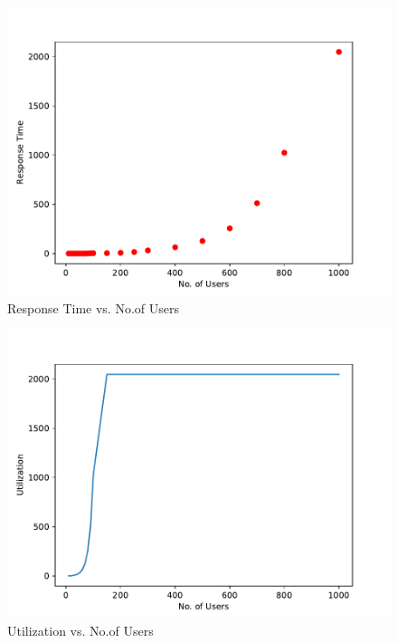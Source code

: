 \documentclass[11pt]{article}
\begin{document}
				\begin{figure}[ht]
					\begin{center}
						\includegraphics[scale=0.5]{plot3.pdf}
						\caption{\label{fig:plot3} Response Time vs. No.of Users}
					\end{center}
				\end{figure}
				\begin{figure}[ht]
					\begin{center}
						\includegraphics[scale=0.5]{plot4.pdf}
						\caption{\label{fig:plot4} Utilization vs. No.of Users}
					\end{center}
				\end{figure}
\end{document}
